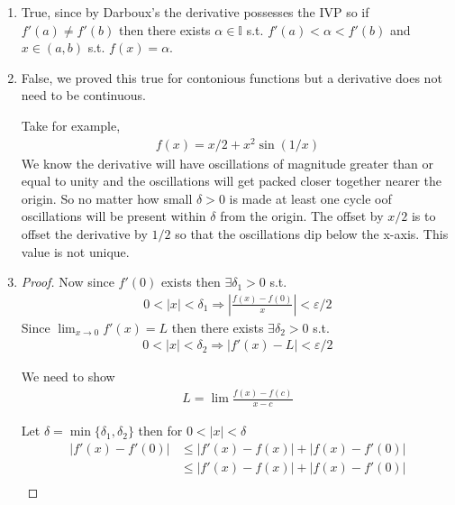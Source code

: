 \begin{enumerate}[label=(\alph*)]
    \item True, since by Darboux's \Thm the derivative possesses 
    the IVP so if $f'(a) \neq f'(b)$ then there exists $\alpha \in \mathbb{I}$
    s.t. $f'(a)< \alpha < f'(b)$ and $x\in (a,b)$ s.t. $f(x)=\alpha$.

    \item
    False, we proved this true for contonious functions but a derivative 
    does not need to be continuous.

    Take for example,
    \begin{align}
        f(x)=x/2 + x^2 \sin(1/x)
    \end{align}
    We know the derivative will have oscillations of magnitude greater than 
    or equal to unity and the oscillations will get packed closer together
    nearer the origin. So no matter how small $\delta>0$ is made at least 
    one cycle oof oscillations will be present within $\delta$ from 
    the origin. The offset by $x/2$ is to offset the derivative by 
    $1/2$ so that the oscillations dip below the x-axis. This value is 
    not unique.

    \item
    \begin{proof}
        Now since $f'(0)$ exists then $\exists \delta_1 >0 $ s.t. 
        \begin{align}
            0<|x|<\delta_1 \Rightarrow |\frac{f(x)-f(0)}{x}| < \varepsilon/2
        \end{align}
        Since $\lim_{x\rightarrow 0} f'(x)=L$ then 
        there exists  $\exists \delta_2 >0 $ s.t. 
        \begin{align}
            0<|x|<\delta_2 \Rightarrow |f'(x)-L| < \varepsilon/2
        \end{align}
        
        We need to show 
        \begin{align*}
            L=\lim \frac{f(x)-f(c)}{x-c}
        \end{align*}

        Let $\delta = \min\{\delta_1,\delta_2\}$ then for $0<|x|<\delta$
        \begin{align}
            |f'(x) - f'(0)| &\leq |f'(x) - f(x)| + |f(x) - f'(0)| \\
                            &\leq |f'(x) - f(x)| + |f(x) - f'(0)| \\
        \end{align}
    \end{proof}
\end{enumerate}